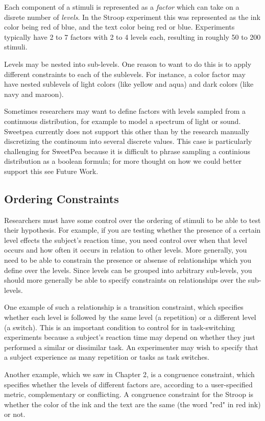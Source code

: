 Each component of a stimuli is represented as a \emph{factor} which can take on a disrete number of \emph{levels}. In the Stroop experiment this was represented as the ink color being red of blue, and the text color being red or blue. Experiments typically have 2 to 7 factors with 2 to 4 levels each, resulting in roughly 50 to 200 stimuli.

Levels may be nested into sub-levels. One reason to want to do this is to apply different constraints to each of the sublevels. For instance, a color factor may have nested sublevels of light colors (like yellow and aqua) and dark colors (like navy and maroon).

Sometimes researchers may want to define factors with levels sampled from a continuous distribution, for example to model a spectrum of light or sound. Sweetpea currently does not support this other than by the research manually discretizing the continoum into several discrete values. This case is particularly challenging for SweetPea because it is difficult to phrase sampling a continious distribution as a boolean formula; for more thought on how we could better support this see Future Work.

\subsection{Ordering Constraints}

Researchers must have some control over the ordering of stimuli to be able to test their hypothesis. For example, if you are testing whether the presence of a certain level effects the subject's reaction time, you need control over when that level occurs and how often it occurs in relation to other levels. More generally, you need to be able to constrain the presence or absense of relationships which you define over the levels. Since levels can be grouped into arbitrary sub-levels, you should more generally be able to specify constraints on relationships over the sub-levels.

One example of such a relationship is a transition constraint, which specifies whether each level is followed by the same level (a repetition) or a different level (a switch). This is an important condition to control for in task-switching experiments because a subject's reaction time may depend on whether they just performed a similar or dissimilar task. An experimenter may wish to specify that a subject experience as many repetition or tasks as task switches.

Another example, which we saw in Chapter 2, is a congruence constraint, which specifies whether the levels of different factors are, according to a user-specified metric, complementary or conflicting. A congruence constraint for the Stroop is whether the color of the ink and the text are the same (the word "red" in red ink) or not.

